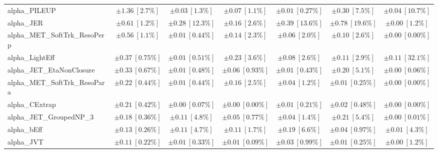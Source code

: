 \begin{sidewaystable}
\begin{center}
\begin{tabular*}{\textwidth}{@{\extracolsep{\fill}}lcccccc}
alpha\_PILEUP         & $\pm 1.36\ [2.7\%] $          & $\pm 0.03\ [1.3\%] $          & $\pm 0.07\ [1.1\%] $          & $\pm 0.01\ [0.27\%] $          & $\pm 0.30\ [7.5\%] $          & $\pm 0.04\ [10.7\%] $       \\
alpha\_JER         & $\pm 0.61\ [1.2\%] $          & $\pm 0.28\ [12.3\%] $          & $\pm 0.16\ [2.6\%] $          & $\pm 0.39\ [13.6\%] $          & $\pm 0.78\ [19.6\%] $          & $\pm 0.00\ [1.2\%] $       \\
alpha\_MET\_SoftTrk\_ResoPerp         & $\pm 0.56\ [1.1\%] $          & $\pm 0.01\ [0.44\%] $          & $\pm 0.14\ [2.3\%] $          & $\pm 0.06\ [2.0\%] $          & $\pm 0.10\ [2.6\%] $          & $\pm 0.00\ [0.00\%] $       \\
alpha\_LightEff         & $\pm 0.37\ [0.75\%] $          & $\pm 0.01\ [0.51\%] $          & $\pm 0.23\ [3.6\%] $          & $\pm 0.08\ [2.6\%] $          & $\pm 0.11\ [2.9\%] $          & $\pm 0.11\ [32.1\%] $       \\
alpha\_JET\_EtaNonClosure         & $\pm 0.33\ [0.67\%] $          & $\pm 0.01\ [0.48\%] $          & $\pm 0.06\ [0.93\%] $          & $\pm 0.01\ [0.43\%] $          & $\pm 0.20\ [5.1\%] $          & $\pm 0.00\ [0.06\%] $       \\
alpha\_MET\_SoftTrk\_ResoPara         & $\pm 0.22\ [0.44\%] $          & $\pm 0.01\ [0.44\%] $          & $\pm 0.16\ [2.5\%] $          & $\pm 0.04\ [1.2\%] $          & $\pm 0.01\ [0.25\%] $          & $\pm 0.00\ [0.00\%] $       \\
alpha\_CExtrap         & $\pm 0.21\ [0.42\%] $          & $\pm 0.00\ [0.07\%] $          & $\pm 0.00\ [0.00\%] $          & $\pm 0.01\ [0.21\%] $          & $\pm 0.02\ [0.48\%] $          & $\pm 0.00\ [0.00\%] $       \\
alpha\_JET\_GroupedNP\_3         & $\pm 0.18\ [0.36\%] $          & $\pm 0.11\ [4.8\%] $          & $\pm 0.05\ [0.77\%] $          & $\pm 0.04\ [1.4\%] $          & $\pm 0.21\ [5.4\%] $          & $\pm 0.00\ [0.01\%] $       \\
alpha\_bEff         & $\pm 0.13\ [0.26\%] $          & $\pm 0.11\ [4.7\%] $          & $\pm 0.11\ [1.7\%] $          & $\pm 0.19\ [6.6\%] $          & $\pm 0.04\ [0.97\%] $          & $\pm 0.01\ [4.3\%] $       \\
alpha\_JVT         & $\pm 0.11\ [0.22\%] $          & $\pm 0.01\ [0.33\%] $          & $\pm 0.01\ [0.09\%] $          & $\pm 0.03\ [0.99\%] $          & $\pm 0.01\ [0.25\%] $          & $\pm 0.00\ [1.2\%] $       \\

\end{tabular*}
\end{center}
\end{sidewaystable}
